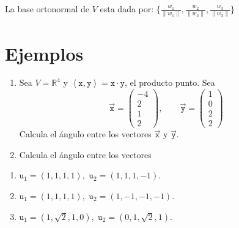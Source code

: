 \documentclass[
]{article}
\begin{document}
La base ortonormal de \(V\) esta dada por:
\(\Big\{\frac{w_1}{\|w_1\|}, \frac{w_2}{\|w_2\|},\frac{w_3}{\|w_3\|} \Big\}\)

\hypertarget{ejemplos}{%
\section{Ejemplos}\label{ejemplos}}

\begin{enumerate}
\def\labelenumi{\arabic{enumi}.}
\item
  Sea \(V=\mathbb{R}^4\) y
  \(\left \langle \mathtt{x}, \mathtt{y}\right \rangle = \mathtt{x} \cdot \mathtt{y}\),
  el producto punto. Sea \[
  \mathtt{\vec{x}} =\begin{pmatrix} -4 \\ 2 \\ 1 \\2 \end{pmatrix}, \quad\quad \mathtt{\vec{y}} =\begin{pmatrix} 1 \\ 0 \\ 2 \\2 \end{pmatrix}
  \] Calcula el ángulo entre los vectores \(\mathtt{\vec{x}}\) y
  \(\mathtt{\vec{y}}\).
\item
  Calcula el ángulo entre los vectores
\end{enumerate}

\begin{enumerate}
\def\labelenumi{\alph{enumi})}
\item
  \(\mathtt{u}_1=(1,1,1,1),\,\, \mathtt{u}_2=(1,1,1,-1)\).
\item
  \(\mathtt{u}_1=(1,1,1,1),\,\, \mathtt{u}_2=(1,-1,-1,-1)\).
\item
  \(\mathtt{u}_1=(1,\sqrt{2},1,0),\,\, \mathtt{u}_2=(0,1,\sqrt{2},1)\).
\end{enumerate}
\end{document}

